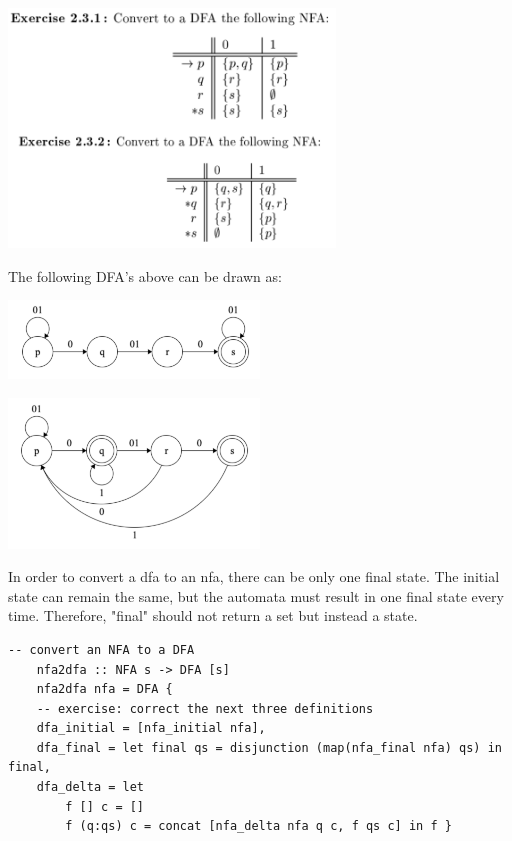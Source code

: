 \documentclass{article}
\theoremstyle{theorem}
\theoremstyle{definition}
\theoremstyle{remark}
\begin{document}
\includegraphics[width=0.65\textwidth]{Images/2.3.1and2.3.2_chart.png}

\noindent
The following DFA's above can be drawn as:

\medskip
\begin{center}
\includegraphics[width=0.50\textwidth]{Images/2.3.1.png}

\includegraphics[width=0.50\textwidth]{Images/2.3.2.png}
\end{center}

\medskip\noindent
In order to convert a dfa to an nfa, there can be only one final state. The initial state can remain the same, but the automata must result in one final state every time. Therefore, "final" should not return a set but instead a state.

\begin{lstlisting}[style=HaskellStyle]
    -- convert an NFA to a DFA
    nfa2dfa :: NFA s -> DFA [s]
    nfa2dfa nfa = DFA {
    -- exercise: correct the next three definitions 
    dfa_initial = [nfa_initial nfa],
    dfa_final = let final qs = disjunction (map(nfa_final nfa) qs) in final,
    dfa_delta = let
        f [] c = []
        f (q:qs) c = concat [nfa_delta nfa q c, f qs c] in f }
\end{lstlisting}
\end{document}
